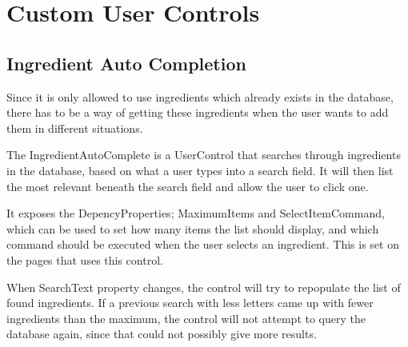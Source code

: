 \chapter{Custom User Controls}

\section{Ingredient Auto Completion} \label{sec:AutoComplete}
Since it is only allowed to use ingredients which already exists in the database, there has to be a way of getting these ingredients when the user wants to add them in different situations.

The IngredientAutoComplete is a UserControl that searches through ingredients in the database, based on what a user types into a search field. It will then list the most relevant beneath the search field and allow the user to click one.

It exposes the DepencyProperties; MaximumItems and SelectItemCommand, which can be used to set how many items the list should display, and which command should be executed when the user selects an ingredient. This is set on the pages that uses this control.

When SearchText property changes, the control will try to repopulate the list of found ingredients. If a previous search with less letters came up with fewer ingredients than the maximum, the control will not attempt to query the database again, since that could not possibly give more results.